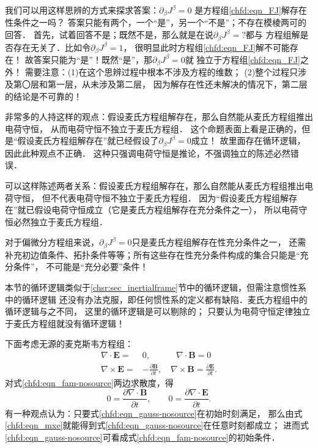 我们可以用这样思辨的方式来探求答案：$\partial_{\beta} J^{\beta}=0$
是方程组\eqref{chfd:eqn_FJ}解存在性条件之一吗？
答案只能有两个，一个“是”，另一个“不是”；不存在模棱两可的回答．
首先，试着回答不是；既然不是，那么就是在说$\partial_{\beta} J^{\beta}=?$都与
方程组解是否存在无关了．比如令$\partial_{\beta} J^{\beta}=1$，
很明显此时方程组\eqref{chfd:eqn_FJ}解不可能存在！
故答案只能为“是”！既然“是”，那$\partial_{\beta} J^{\beta}=0$就
独立于方程组\eqref{chfd:eqn_FJ}之外！
需要注意：(1)在这个思辨过程中根本不涉及方程的维数；
(2)整个过程只涉及第〇层和第一层，从未涉及第二层，
因为解存在性还未解决的情况下，第二层的结论是不可靠的！


非常多的人持这样的观点：假设麦氏方程组解存在，那么自然能从麦氏方程组推出电荷守恒，
从而电荷守恒不独立于麦氏方程组．
这个命题表面上看是正确的，但是“假设麦氏方程组解存在”就已经假设了$\partial_{\beta} J^{\beta}=0$成立！
故里面存在循环逻辑，因此此种观点不正确．
这种只强调电荷守恒是推论，不强调独立的陈述必然错误．



可以这样陈述两者关系：假设麦氏方程组解存在，那么自然能从麦氏方程组推出电荷守恒，
但不代表电荷守恒不独立于麦氏方程组．
因为“假设麦氏方程组解存在”就已假设电荷守恒成立（它是麦氏方程组解存在充分条件之一），
所以电荷守恒必然独立于麦氏方程组．

对于偏微分方程组来说，$\partial_{\beta} J^{\beta}=0$只是麦氏方程组解存在性充分条件之一，
还需补充初边值条件、拓扑条件等等；所有这些存在性充分条件构成的集合只能是“充分条件”，
不可能是“充分必要”条件！


本节的循环逻辑类似于\ref{chsr:sec_inertialframe}节中的循环逻辑，但需注意惯性系中的循环逻辑
还没有办法克服，即任何惯性系的定义都有缺陷．麦氏方程组中的循环逻辑与之不同，
这里的循环逻辑是可以剔除的；
只要认为电荷守恒定律独立于麦氏方程组就没有循环逻辑！


下面考虑无源的麦克斯韦方程组：
\begin{subequations}\label{chfd:eqn_maxwell-nosource}
    \begin{align}
        \nabla \cdot  \boldsymbol{E} =& 0, \qquad\quad
        \nabla \cdot  \boldsymbol{B} = 0  \label{chfd:eqn_gauss-nosource}\\
        \nabla \times \boldsymbol{E} =& -\frac{\partial \boldsymbol{B}}{\partial t} , \quad
        \nabla \times \boldsymbol{B} = \frac{\partial \boldsymbol{E}}{\partial t}.
        \label{chfd:eqn_fam-nosource}
    \end{align}
\end{subequations}
对式\eqref{chfd:eqn_fam-nosource}两边求散度，得
\begin{equation}\label{chfd:eqn_mxe}
    0 = \frac{\partial \nabla \cdot\boldsymbol{B}}{\partial t} , \qquad
    0 = \frac{\partial \nabla \cdot\boldsymbol{E}}{\partial t}.
\end{equation}
有一种观点认为：只要式\eqref{chfd:eqn_gauss-nosource}在初始时刻满足，
那么由式\eqref{chfd:eqn_mxe}就能得到式\eqref{chfd:eqn_gauss-nosource}在任意时刻都成立；
进而式\eqref{chfd:eqn_gauss-nosource}可看成式\eqref{chfd:eqn_fam-nosource}的初始条件．

